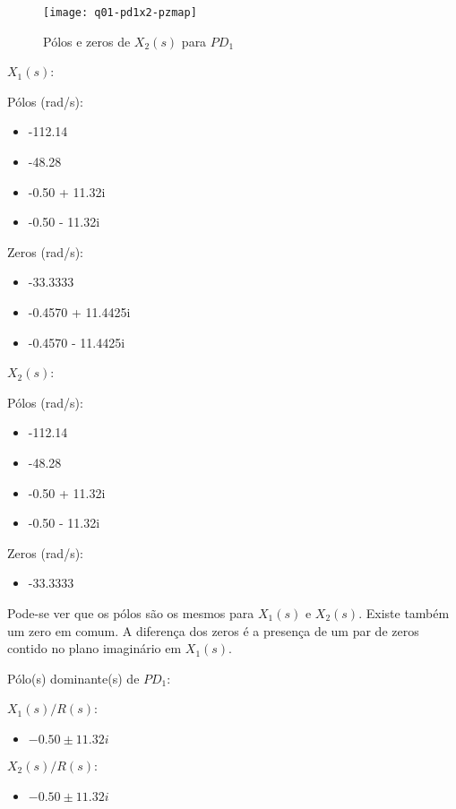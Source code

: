 \documentclass[a4paper,11pt]{article}
\begin{document}
\begin{figure}[H]
\centering
\texttt{[image: q01-pd1x2-pzmap]}
\caption{Pólos e zeros de $X_2\left(s\right)$ para $PD_1$}
\end{figure}

$X_1\left(s\right)$:

\begin{multicols}{2}
    Pólos (rad/s):
    \begin{itemize}
        \item -112.14
        \item -48.28
        \item -0.50 + 11.32i
        \item -0.50 - 11.32i
    \end{itemize}
\columnbreak
    Zeros (rad/s):
    \begin{itemize}
        \item -33.3333
        \item -0.4570 + 11.4425i
        \item -0.4570 - 11.4425i
    \end{itemize}
\end{multicols}

$X_2\left(s\right)$:

\begin{multicols}{2}
    Pólos (rad/s):
    \begin{itemize}
        \item -112.14
        \item -48.28
        \item -0.50 + 11.32i
        \item -0.50 - 11.32i
    \end{itemize}
\columnbreak
    Zeros (rad/s):
    \begin{itemize}
        \item -33.3333
    \end{itemize}
\end{multicols}

Pode-se ver que os pólos são os mesmos para $X_1\left(s\right)$ e
$X_2\left(s\right)$. Existe também um zero em comum. A diferença dos zeros é a
presença de um par de zeros contido no plano imaginário em $X_1\left(s\right)$.

Pólo(s) dominante(s) de $PD_1$:

\begin{multicols}{2}
    $X_1\left(s\right) / R\left(s\right)$:
    \begin{itemize}
        \item $-0.50 \pm 11.32i$
    \end{itemize}
\columnbreak
    $X_2\left(s\right) / R\left(s\right)$:
    \begin{itemize}
        \item $-0.50 \pm 11.32i$
    \end{itemize}
\end{multicols}
\end{document}
